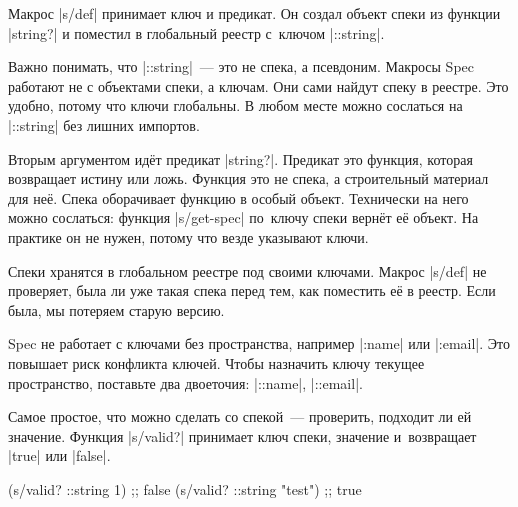 
Макрос \spverb|s/def| принимает ключ и предикат. Он создал объект спеки из
функции \spverb|string?| и поместил в глобальный реестр с~ключом
\spverb|::string|.

Важно понимать, что \spverb|::string|~--- это не спека, а псевдоним. Макросы
Spec работают не с объектами спеки, а ключам. Они сами найдут спеку в
реестре. Это удобно, потому что ключи глобальны. В любом месте можно сослаться
на \spverb|::string| без лишних импортов.


Вторым аргументом ид\"{е}т предикат \spverb|string?|. Предикат это функция,
которая возвращает истину или ложь. Функция это не спека, а строительный
материал для не\"{е}. Спека оборачивает функцию в особый объект. Технически на
него можно сослаться: функция \spverb|s/get-spec| по~ключу спеки верн\"{е}т
е\"{е} объект. На практике он не нужен, потому что везде указывают ключи.

\begin{english}
\end{english}


Спеки хранятся в глобальном реестре под своими ключами. Макрос \spverb|s/def| не
проверяет, была ли уже такая спека перед тем, как поместить е\"{е} в
реестр. Если была, мы потеряем старую версию.


Spec не работает с ключами без пространства, например \spverb|:name| или
\spverb|:email|. Это повышает риск конфликта ключей. Чтобы назначить ключу
текущее пространство, поставьте два двоеточия: \spverb|::name|, \spverb|::email|.


Самое простое, что можно сделать со спекой~--- проверить, подходит ли ей
значение. Функция \spverb|s/valid?| принимает ключ спеки, значение и~возвращает
\spverb|true| или \spverb|false|.

\begin{english}
  \begin{clojure}
(s/valid? ::string 1)      ;; false
(s/valid? ::string "test") ;; true
  \end{clojure}
\end{english}

